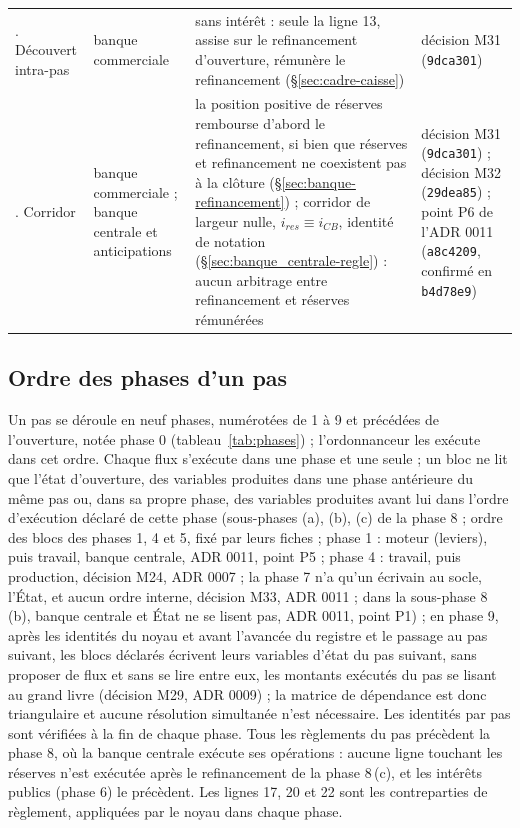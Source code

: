 \documentclass[11pt,a4paper]{article}
\begin{document}
\begin{center}
\begin{longtable}{>{\raggedright\arraybackslash}p{2.9cm}>{\raggedright\arraybackslash}p{2.3cm}>{\raggedright\arraybackslash}p{5.8cm}>{\raggedright\arraybackslash}p{3.6cm}}
4. Découvert intra-pas & banque commerciale & sans intérêt : seule la ligne 13, assise sur le refinancement d'ouverture, rémunère le refinancement (\S\ref{sec:cadre-caisse}) & décision M31 (\texttt{9dca301})\\
5. Corridor & banque commerciale ; banque centrale et anticipations & la position positive de réserves rembourse d'abord le refinancement, si bien que réserves et refinancement ne coexistent pas à la clôture (\S\ref{sec:banque-refinancement}) ; corridor de largeur nulle, $i_{\mathit{res}} \equiv i_{\mathit{CB}}$, identité de notation (\S\ref{sec:banque_centrale-regle}) : aucun arbitrage entre refinancement et réserves rémunérées & décision M31 (\texttt{9dca301}) ; décision M32 (\texttt{29dea85}) ; point P6 de l'ADR 0011 (\texttt{a8c4209}, confirmé en \texttt{b4d78e9})\\
\bottomrule
\end{longtable}
\end{center}

\subsection{Ordre des phases d'un pas}
\label{sec:cadre-phases}
Un pas se déroule en neuf phases, numérotées de 1 à 9 et précédées de l'ouverture, notée phase 0 (tableau~\ref{tab:phases}) ; l'ordonnanceur les exécute dans cet ordre. Chaque flux s'exécute dans une phase et une seule ; un bloc ne lit que l'état d'ouverture, des variables produites dans une phase antérieure du même pas ou, dans sa propre phase, des variables produites avant lui dans l'ordre d'exécution déclaré de cette phase (sous-phases (a), (b), (c) de la phase 8 ; ordre des blocs des phases 1, 4 et 5, fixé par leurs fiches ; phase 1 : moteur (leviers), puis travail, banque centrale, ADR 0011, point P5 ; phase 4 : travail, puis production, décision M24, ADR 0007 ; la phase 7 n'a qu'un écrivain au socle, l'État, et aucun ordre interne, décision M33, ADR 0011 ; dans la sous-phase 8\,(b), banque centrale et État ne se lisent pas, ADR 0011, point P1) ; en phase 9, après les identités du noyau et avant l'avancée du registre et le passage au pas suivant, les blocs déclarés écrivent leurs variables d'état du pas suivant, sans proposer de flux et sans se lire entre eux, les montants exécutés du pas se lisant au grand livre (décision M29, ADR 0009) ; la matrice de dépendance est donc triangulaire et aucune résolution simultanée n'est nécessaire. Les identités par pas sont vérifiées à la fin de chaque phase. Tous les règlements du pas précèdent la phase 8, où la banque centrale exécute ses opérations : aucune ligne touchant les réserves n'est exécutée après le refinancement de la phase 8\,(c), et les intérêts publics (phase 6) le précèdent. Les lignes 17, 20 et 22 sont les contreparties de règlement, appliquées par le noyau dans chaque phase.
\end{document}
